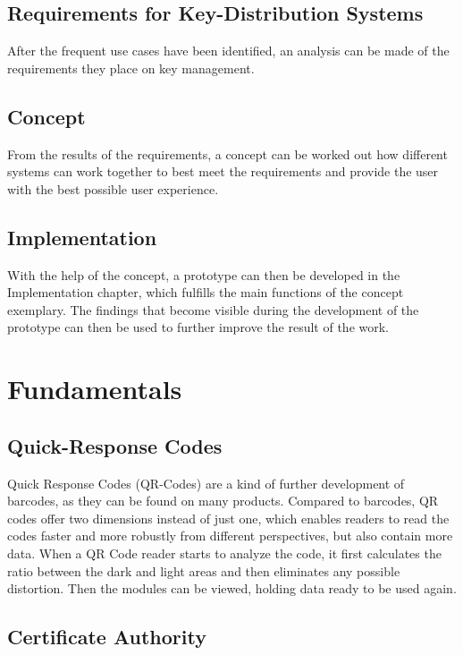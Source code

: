 \documentclass[12pt,oneside,a4paper,parskip]{scrbook}
\begin{document}
\section{Requirements for Key-Distribution Systems}

After the frequent use cases have been identified, an analysis can be made of the requirements they place on key management. 

\section{Concept}

From the results of the requirements, a concept can be worked out how different systems can work together to best meet the requirements and provide the user with the best possible user experience. 

\section{Implementation}

With the help of the concept, a prototype can then be developed in the Implementation chapter, which fulfills the main functions of the concept exemplary. The findings that become visible during the development of the prototype can then be used to further improve the result of the work.

\chapter{Fundamentals}

\section{Quick-Response Codes}

Quick Response Codes (QR-Codes) are a kind of further development of barcodes, as they can be found on many products. Compared to barcodes, QR codes offer two dimensions instead of just one, which enables readers to read the codes faster and more robustly from different perspectives, but also contain more data. When a QR Code reader starts to analyze the code, it first calculates the ratio between the dark and light areas and then eliminates any possible distortion. Then the modules can be viewed, holding data ready to be used again. \parencite{office_masahiro_1994}

\section{Certificate Authority}
\label{sec:CA}
\end{document}
